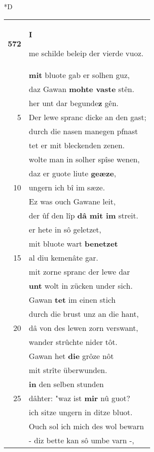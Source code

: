 \documentclass[8pt,a4paper,notitlepage]{article}
\begin{document}
\begin{table}[ht]
\begin{minipage}[t]{0.5\linewidth}
\small
\begin{center}*D
\end{center}
\begin{tabular}{rl}
\textbf{572} & \begin{large}\textbf{I}\end{large}me schilde beleip der vierde vuoz.\\ 
 & \textbf{mit} bluote gab er solhen guz,\\ 
 & daz Gawan \textbf{mohte vaste} stên.\\ 
 & her unt dar begunde\textbf{z} gên.\\ 
5 & Der lewe spranc dicke an den gast;\\ 
 & durch die nasen manegen pfnast\\ 
 & tet er mit bleckenden zenen.\\ 
 & wolte man in solher spîse wenen,\\ 
 & daz er guote liute \textbf{geæze},\\ 
10 & ungern ich bî im sæze.\\ 
 & Ez was ouch Gawane leit,\\ 
 & der ûf den lîp \textbf{dâ mit im} streit.\\ 
 & er hete in sô geletzet,\\ 
 & mit bluote wart \textbf{benetzet}\\ 
15 & al diu kemenâte gar.\\ 
 & mit zorne spranc der lewe dar\\ 
 & \textbf{unt} wolt in zücken under sich.\\ 
 & Gawan \textbf{tet} im einen stich\\ 
 & durch die brust unz an die hant,\\ 
20 & dâ von des lewen zorn verswant,\\ 
 & wander strûchte nider tôt.\\ 
 & Gawan het \textbf{die} grôze nôt\\ 
 & mit strîte überwunden.\\ 
 & \textbf{in} den selben stunden\\ 
25 & dâhter: "waz ist \textbf{mir} nû guot?\\ 
 & ich sitze ungern in ditze bluot.\\ 
 & Ouch sol ich mich des wol bewarn\\ 
 & - diz bette kan sô umbe varn -,\\ 

\end{tabular}
\end{minipage}
\end{table}
\end{document}
